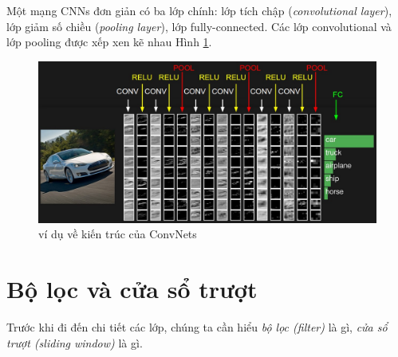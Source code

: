 Một mạng CNNs đơn giản có ba lớp chính: lớp tích chập (\textit{convolutional layer}), lớp giảm số chiều (\textit{pooling layer}), lớp fully-connected. Các lớp convolutional và lớp pooling được xếp xen kẽ nhau Hình \ref{fig:convNetArch}.
\begin{center}
\begin{figure}[H]
	\begin{center}
		\includegraphics[scale=0.2]{chap4/image/convnet.jpeg}
	\end{center}
	\caption{ví dụ về kiến trúc của ConvNets}
	
\label{fig:convNetArch}
\end{figure}
\end{center}
\section{Bộ lọc và cửa sổ trượt}
Trước khi đi đến chi tiết các lớp, chúng ta cần hiểu \textit{bộ lọc (filter)} là gì, \textit{cửa sổ trượt (sliding window)} là gì.

